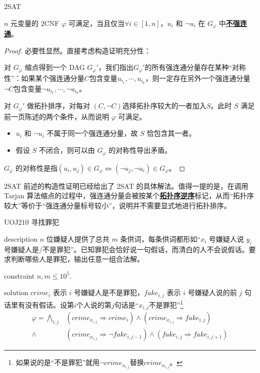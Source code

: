 \documentclass{beamer}
\def\obj#1{\textbf{\uline{#1}}}
\def\le{\leqslant}
\begin{document}
\begin{frame}{$2$\textrm{SAT}}
	\begin{theorem}
		$n$ 元变量的 $2$\textrm{CNF} $\varphi$ 可满足，当且仅当$\forall i \in [1, n]$，$u_i$ 和 $\lnot u_i$ 在 $G_{\varphi}$ 中\obj{不强连通}。
	\end{theorem}\pause
	\begin{proof}
		必要性显然。直接考虑构造证明充分性：

		对 $G_{\varphi}$ 缩点得到一个 DAG $G_{\varphi}'$，我们指出$G_{\varphi}'$的所有强连通分量存在某种“对称性”：如果某个强连通分量$C$包含变量$u_{i_1}, \cdots, u_{i_k}$，则一定存在另外一个强连通分量$\lnot C$包含变量$\lnot u_{i_1}, \cdots, \lnot u_{i_k}$。
		
		对 $G_{\varphi}'$ 做拓扑排序，对每对 $(C, \lnot C)$选择拓扑序较大的一者加入$S$。此时 $S$ 满足前一页陈述的两个条件，从而说明 $\varphi$ 可满足。

		\begin{itemize}
			\item $u_i$ 和 $\lnot u_i$ 不属于同一个强连通分量，故 $S$ 恰包含其一者。
			\item 假设 $S$ 不闭合，则可以由 $G_{\varphi}$ 的对称性导出矛盾。
		\end{itemize}

		$G_{\varphi}$ 的对称性是指$(u_i, u_j) \in G_{\varphi} \Leftrightarrow (\lnot u_j, \lnot u_i) \in G_{\varphi}$。
	\end{proof}
\end{frame}
\begin{frame}{$2$\textrm{SAT}}
	前述的构造性证明已经给出了 $2$\textrm{SAT} 的具体解法。值得一提的是，在调用 Tarjan 算法缩点的过程中，强连通分量会被按某个\obj{拓扑序逆序}标记，从而“拓扑序较大”等价于“强连通分量标号较小”，说明并不需要显式地进行拓扑排序。
\end{frame}
\begin{frame}{UOJ210 寻找罪犯}
	\begin{block}{description}
		$n$ 位嫌疑人提供了总共 $m$ 条供词，每条供词都形如“$x_i$ 号嫌疑人说 $y_i$ 号嫌疑人是/不是罪犯”。已知罪犯会恰好说一句假话，而清白的人不会说假话。要求判断哪些人是罪犯，输出任意一组合法解。
	\end{block}
	\begin{block}{constraint}
		$n, m \le 10^5.$
	\end{block}
	\pause
	\begin{block}{solution}
		$crime_i$ 表示 $i$ 号嫌疑人是不是罪犯，$fake_{i,j}$ 表示 $i$ 号嫌疑人说的前 $j$ 句话里有没有假话。设第$i$个人说的第$j$句话是“$x_{i, j}$不是罪犯”\footnote{\tiny 如果说的是“不是罪犯”就用$\lnot crime_{x_{i,j}}$替换$crime_{x_{i,j}}$。}
		\begin{align*}
			\varphi = \bigwedge_{i,j} &(crime_{x_{i,j}} \Rightarrow crime_i) \wedge (crime_{x_{i,j}} \Rightarrow fake_{i,j}) \\ \wedge &(crime_{x_{i,j}} \Rightarrow \lnot fake_{i,j-1}) \wedge (fake_{i,j} \Rightarrow fake_{i, j+1})
		\end{align*}
	\end{block}
\end{frame}
\end{document}
